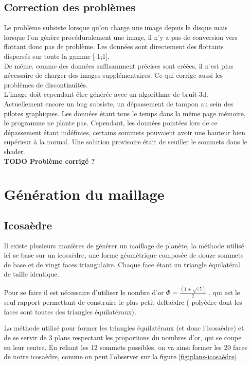     \subsection{Correction des problèmes}
    Le problème subsiste lorsque qu'on charge une image depuis le disque mais lorsque l'on génère procéduralement une image,
    il n'y a pas de conversion vers flottant donc pas de problème. Les données sont directement des flottants dispersés sur toute la gamme [-1;1].\\
    De même, comme des données suffisamment précises sont créées, il n'est plus nécessaire de charger des images supplémentaires. Ce qui corrige aussi les problèmes de discontinuités.\\
    L'image doit cependant être générée avec un algorithme de bruit 3d.\\
    
    
    Actuellement encore un bug subsiste, un dépassement de tampon au sein des pilotes graphiques. 
    Les données étant tous le temps dans
    la même page mémoire, le programme ne plante pas. Cependant, les données pointées lors de ce dépassement étant indéfinies, certains sommets pouvaient avoir une hauteur bien supérieur à la normal. Une solution provisoire était de seuiller le sommets dans le shader.\\
    \textbf{TODO Problème corrigé ?}
    
   \section{Génération du maillage}	%
	\subsection{Icosaèdre}
	\label{subsec:icosahedre}
	
	Il existe plusieurs manières de générer un maillage de planète, la méthode utilisé ici
	se base sur un icosaèdre, une forme géométrique composée de douze sommets de base et 
	de vingt faces triangulaire. Chaque face étant un triangle équilatéral de taille identique.
	
	Pour se faire il est nécessaire d'utiliser le nombre d'or $\Phi = \frac{(1+\sqrt(5)}{2}$ , qui est le seul rapport permettant de construire le plus petit deltaèdre ( polyèdre dont les faces sont toutes des triangles équilatéraux).
	
	La méthode utilisé pour former les triangles équilatéraux (et donc l'isosaèdre) et de se servir de 3 plans respectant les proportions du nombres d'or, qui se coupe en leur centre. En reliant les 12 sommets possibles, on va ainsi former les 20 faces de notre icosaèdre, comme on peut l'observer sur la figure \ref{fig:plans-icosaèdre}.
	

